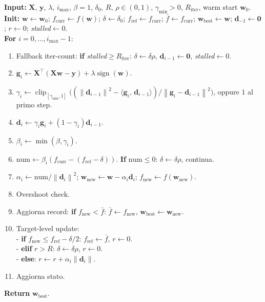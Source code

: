 \documentclass[11pt,a4paper]{article}
\newcommand{\norm}[1]{\left\|#1\right\|}
\newcommand{\inner}[2]{\langle #1,\,#2\rangle}
\newcommand{\bw}{\mathbf{w}}
\newcommand{\bg}{\mathbf{g}}
\newcommand{\bd}{\mathbf{d}}
\newcommand{\by}{\mathbf{y}}
\newcommand{\bX}{\mathbf{X}}
\newcommand{\bzero}{\mathbf{0}}
\theoremstyle{definition}
\begin{document}
\begin{tcolorbox}[colback=gray!5,colframe=black,boxrule=0.4pt,arc=2pt,title=Algoritmo SGPTL]
\textbf{Input:} $\bX$, $\by$, $\lambda$, $i_{\max}$, $\beta=1$, $\delta_0$, $R$, $\rho\in(0,1)$, $\gamma_{\min}>0$, $R_{\mathrm{iter}}$, warm start $\bw_0$.\\
\textbf{Init:} $\bw\gets\bw_0$; $f_{\text{curr}}\gets f(\bw)$; $\delta\gets\delta_0$; $f_{\mathrm{ref}}\gets f_{\text{curr}}$; $\bar f\gets f_{\text{curr}}$; $\bw_{\text{best}}\gets\bw$; $\bd_{-1}\gets\bzero$; $r\gets 0$; \textit{stalled}$\gets 0$.\\[0.3em]
\textbf{For} $i=0,\dots,i_{\max}-1$:
\begin{enumerate}[leftmargin=*,nosep]
\item Fallback iter-count: \textbf{if} \textit{stalled}$\ge R_{\mathrm{iter}}$: $\delta\gets\delta\rho$, $\bd_{i-1}\gets\bzero$, \textit{stalled}$\gets 0$.
\item $\bg_i \gets \bX^\top(\bX\bw-\by) + \lambda\operatorname{sign}(\bw)$.
\item $\gamma_i \gets \operatorname{clip}_{[\gamma_{\min},1]}\big((\norm{\bd_{i-1}}^2-\inner{\bg_i}{\bd_{i-1}})/\norm{\bg_i-\bd_{i-1}}^2\big)$, oppure $1$ al primo step.
\item $\bd_i \gets \gamma_i\bg_i + (1-\gamma_i)\bd_{i-1}$.
\item $\beta_i\gets\min(\beta,\gamma_i)$.
\item $\text{num}\gets\beta_i(f_{\text{curr}}-(f_{\mathrm{ref}}-\delta))$. \textbf{If} $\text{num}\le 0$: $\delta\gets\delta\rho$, continua.
\item $\alpha_i\gets\text{num}/\norm{\bd_i}^2$; $\bw_{\text{new}}\gets\bw - \alpha_i\bd_i$; $f_{\text{new}}\gets f(\bw_{\text{new}})$.
\item Overshoot check.
\item Aggiorna record: \textbf{if} $f_{\text{new}}<\bar f$: $\bar f\gets f_{\text{new}}$, $\bw_{\text{best}}\gets\bw_{\text{new}}$.
\item Target-level update:\\
- \textbf{if} $f_{\text{new}}\le f_{\mathrm{ref}}-\delta/2$: $f_{\mathrm{ref}}\gets\bar f$, $r\gets 0$.\\
- \textbf{elif} $r > R$: $\delta\gets\delta\rho$, $r\gets 0$.\\
- \textbf{else}: $r\gets r+\alpha_i\norm{\bd_i}$.
\item Aggiorna stato.
\end{enumerate}
\textbf{Return} $\bw_{\text{best}}$.
\end{tcolorbox}
\end{document}
